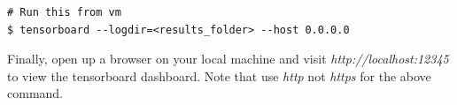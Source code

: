 \begin{lstlisting}
# Run this from vm
$ tensorboard --logdir=<results_folder> --host 0.0.0.0
\end{lstlisting}

Finally, open up a browser on your local machine and visit \textit{http://localhost:12345} to view the tensorboard dashboard. Note that use \textit{http} not \textit{https} for the above command.

\begin{enumerate}[(a)]

	

	

  

  

\end{enumerate}
